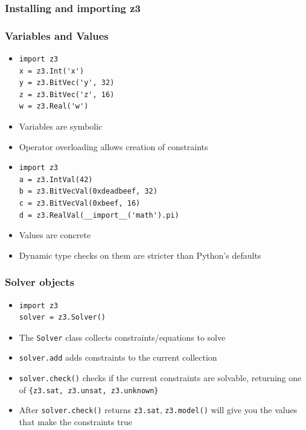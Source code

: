 \documentclass[aspectratio=169]{beamer}
\begin{document}
\begin{frame}[fragile]
\frametitle{Installing and importing z3}
\end{frame}

\begin{frame}[fragile]
\frametitle{Variables and Values}
\begin{itemize}
\item \begin{Verbatim}[fontsize=\scriptsize, frame=single]
import z3
x = z3.Int('x')
y = z3.BitVec('y', 32)
z = z3.BitVec('z', 16)
w = z3.Real('w')
\end{Verbatim}
\item Variables are symbolic
\item Operator overloading allows creation of constraints
\item \begin{Verbatim}[fontsize=\scriptsize, frame=single]
import z3
a = z3.IntVal(42)
b = z3.BitVecVal(0xdeadbeef, 32)
c = z3.BitVecVal(0xbeef, 16)
d = z3.RealVal(__import__('math').pi)
\end{Verbatim}
\item Values are concrete
\item Dynamic type checks on them are stricter than Python's defaults %
\end{itemize}
\end{frame}

\begin{frame}[fragile]
\frametitle{Solver objects}
\begin{itemize}
\item \begin{Verbatim}[fontsize=\scriptsize, frame=single]
import z3
solver = z3.Solver()
\end{Verbatim}
\item The \verb|Solver| class collects constraints/equations to solve
\item \verb|solver.add| adds constraints to the current collection
\item \verb|solver.check()| checks if the current constraints are solvable, returning one of \verb|{z3.sat, z3.unsat, z3.unknown}|
\item After \verb|solver.check()| returns \verb|z3.sat|, \verb|z3.model()| will give you the values that make the constraints true
\end{itemize}
\end{frame}
\end{document}
